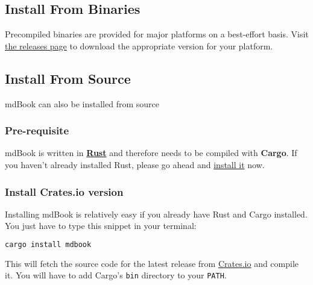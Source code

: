 \documentclass{article}
\begin{document}
\subsection{Install From Binaries}
\label{Install From Binaries}
\label{install-from-binaries}

Precompiled binaries are provided for major platforms on a best-effort basis.
Visit \href{https://github.com/rust-lang-nursery/mdBook/releases}{the releases page}
to download the appropriate version for your platform.\\

\subsection{Install From Source}
\label{Install From Source}
\label{install-from-source}

mdBook can also be installed from source\\

\subsubsection{Pre-requisite}
\label{Pre-requisite}
\label{pre-requisite}

mdBook is written in \textbf{\href{https://www.rust-lang.org/}{Rust}} and therefore needs
to be compiled with \textbf{Cargo}. If you haven't already installed Rust, please go
ahead and \href{https://www.rust-lang.org/tools/install}{install it} now.\\

\subsubsection{Install Crates.io version}
\label{Install Crates.io version}
\label{install-crates-io-version}

Installing mdBook is relatively easy if you already have Rust and Cargo
installed. You just have to type this snippet in your terminal:\\
\begin{lstlisting}[language=bash]
cargo install mdbook

\end{lstlisting}

This will fetch the source code for the latest release from
\href{https://crates.io/}{Crates.io} and compile it. You will have to add Cargo's
\lstinline|bin| directory to your \lstinline|PATH|.\\
\end{document}
